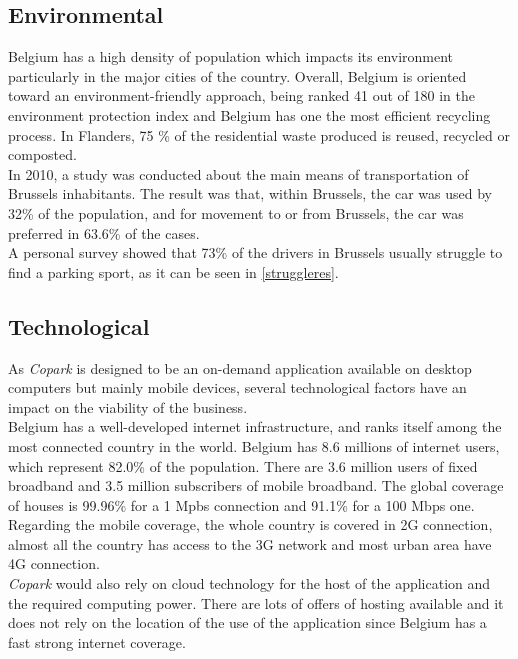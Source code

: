 \documentclass[12pt,a4paper,oneside]{book}
\newcommand{\bp}{\textit{Copark}}
\begin{document}
\subsection{Environmental}

Belgium has a high density of population which impacts its environment particularly in the major cities of the country. Overall, Belgium is oriented toward an environment-friendly approach, being ranked 41 out of 180 in the environment protection index and Belgium has one the most efficient recycling process.\cite{epi} In Flanders, 75 \% of the residential waste produced is reused, recycled or composted.\cite{wastemana}\\

In 2010, a study was conducted about the main means of transportation of Brussels inhabitants. The result was that, within Brussels, the car was used by 32\% of the population, and for movement to or from Brussels, the car was preferred in 63.6\% of the cases.\\

A personal survey showed that 73\% of the drivers in Brussels usually struggle to find a parking sport, as it can be seen in \autoref{struggleres}.

\subsection{Technological}
As \bp{} is designed to be an on-demand application available on desktop computers but mainly mobile devices, several technological factors have an impact on the viability of the business.\\

Belgium has a well-developed internet infrastructure, and ranks itself among the most connected country in the world. Belgium has 8.6 millions of internet users, which represent 82.0\% of the population.\cite{intuser} There are 3.6 million users of fixed broadband and 3.5 million subscribers of mobile broadband.\cite{intsub} The global coverage of houses is 99.96\% for a 1 Mpbs connection and 91.1\% for a 100 Mbps one.\cite{fixcov} Regarding the mobile coverage, the whole country is covered in 2G connection, almost all the country has access to the 3G network and most urban area have 4G connection.\cite{mobcov}\\

\bp{} would also rely on cloud technology for the host of the application and the required computing power. There are lots of offers of hosting available and it does not rely on the location of the use of the application since Belgium has a fast strong internet coverage.\\
\end{document}
